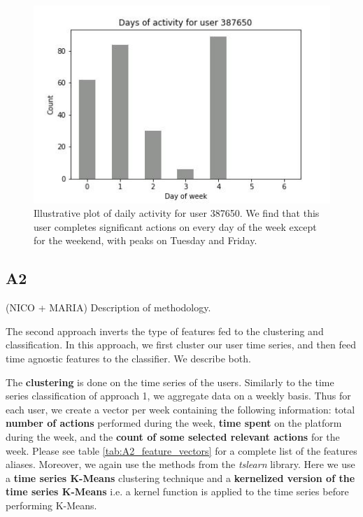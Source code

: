 \documentclass[sigplan,screen]{acmart}
\begin{document}
\begin{figure}
    \centering
    \includegraphics[width=\linewidth]{reports/figures/PWHex.jpg}
    \caption{Illustrative plot of daily activity for user 387650. We find that this user completes significant actions on every day of the week except for the weekend, with peaks on Tuesday and Friday.}
    \label{fig:PWHex}
\end{figure}


\subsection{A2}\label{subsec:A2}
{\color{red}(NICO + MARIA) Description of methodology.}     

The second approach inverts the type of features fed to the clustering and classification. In this approach, we first cluster our user time series, and then feed time agnostic features to the classifier. We describe both.

The \textbf{clustering} is done on the time series of the users. Similarly to the time series classification of approach 1, we aggregate data on a weekly basis. Thus for each user, we create a vector per week containing the following information: total \textbf{number of actions} performed during the week, \textbf{time spent} on the platform during the week, and the \textbf{count of some selected relevant actions} for the week. Please see table \ref{tab:A2_feature_vectors} for a complete list of the features aliases. Moreover, we again use the methods from the  \emph{tslearn}\cite{tslearn} library. Here we use a \textbf{time series K-Means} clustering technique and a \textbf{kernelized version of the time series K-Means} i.e. a kernel function is applied to the time series before performing K-Means.
\end{document}
